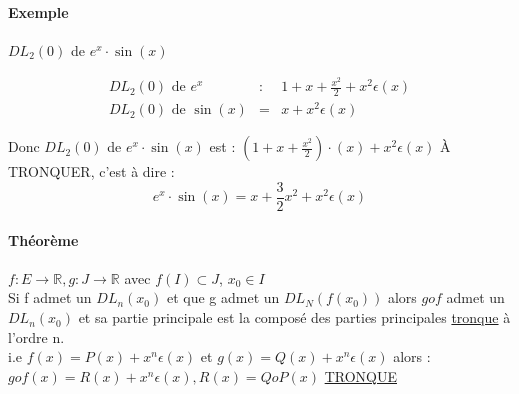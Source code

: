 	\paragraph{Exemple} $DL_2(0)$ de $e^x \cdot \sin(x)$ 

	\[\begin{array}{rcl}
			DL_2(0) \text{ de } e^x &:& 1+x+\frac{x^2}{2} + x^2 \epsilon (x) \\
			DL_2(0) \text{ de } \sin(x) &=& x + x^2\epsilon(x)
	\end{array}\]

	Donc $DL_2(0)$ de $e^x \cdot \sin(x)$ est : $(1+x+\frac{x^2}{2})\cdot(x) + x^2\epsilon(x)$ À TRONQUER, c'est à dire : 
	\[e^x \cdot \sin(x) = x + \frac{3}{2}x^2 +x^2 \epsilon(x)\]

	\paragraph{Théorème} $f:E \rightarrow \mathbb{R}, g : J \rightarrow \mathbb{R}$ avec $f(I) \subset J$, $x_0 \in I$ ~\\
	Si f admet un $DL_n(x_0)$ et que g admet un $DL_N(f(x_0))$ alors $gof$ admet un $DL_n(x_0)$ et sa partie principale est la composé des parties principales \ul{tronque} à l'ordre n. ~\\
	i.e $f(x)=P(x) + x^n \epsilon(x)$ et $g(x) = Q(x) + x^n\epsilon(x)$ alors : ~\\
	$gof(x) = R(x)+x^n \epsilon(x), R(x) = QoP(x)$ \ul{TRONQUE}
